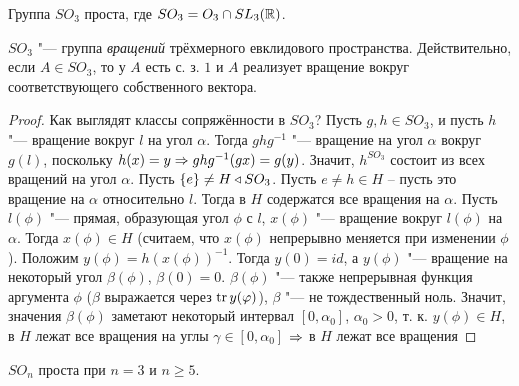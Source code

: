 \documentclass[main]{subfiles}
\begin{document}
\begin{theorem}
  Группа $SO_3$ проста, где $SO_3 = O_3 \cap SL_3(\mathbb{R})$.
\end{theorem}
\begin{remark}
  $SO_3$ "--- группа \emph{вращений} трёхмерного евклидового
  пространства. Действительно, если $A \in SO_3$, то у $A$
  есть с. з. $1$ и $A$ реализует вращение вокруг соответствующего
  собственного вектора.
\end{remark}
\begin{proof}
  Как выглядят классы сопряжённости в $SO_3$? Пусть
  $g, h \in SO_3$, и пусть $h$ "--- вращение вокруг $l$
  на угол $\alpha$.
  Тогда $g h g^{-1}$ "--- вращение на угол $\alpha$ вокруг $g(l)$,
  поскольку $h(x) = y \Rightarrow ghg^{-1}(gx) = g(y)$.
  Значит, $h^{SO_3}$ состоит из всех вращений на угол $\alpha$.
  Пусть $\{ e \} \ne H \triangleleft SO_3$. Пусть $e \ne h \in H$ --
  пусть это вращение на $\alpha$ относительно $l$. Тогда в $H$ содержатся
  все вращения на $\alpha$. Пусть $l(\phi)$ "--- прямая, образующая
  угол $\phi$ с $l$, $x(\phi)$ "--- вращение вокруг $l(\phi)$ на $\alpha$.
  Тогда $x(\phi) \in H$ (считаем, что $x(\phi)$ непрерывно меняется
  при изменении $\phi$). Положим $y(\phi) = h(x(\phi))^{-1}$. Тогда
  $y(0) = id$, а $y(\phi)$ "--- вращение на некоторый угол $\beta(\phi)$,
  $\beta(0) = 0$. $\beta(\phi)$ "--- также непрерывная функция
  аргумента $\phi$ ($\beta$ выражается через $\operatorname{tr} y(\varphi)$),
  $\beta$ "--- не тождественный ноль. Значит, значения
  $\beta(\phi)$ заметают некоторый интервал
  $[0, \alpha_0]$, $\alpha_0 > 0$, т. к. $y(\phi) \in H$,
  в $H$ лежат все вращения на углы $\gamma \in [0, \alpha_0]$
  $\Rightarrow$ в $H$ лежат все вращения 
\end{proof}

\begin{remark}
  $SO_n$ проста при $n = 3$ и $n \ge 5$.
\end{remark}
\end{document}
